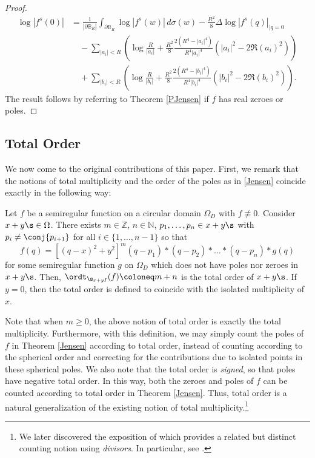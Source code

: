 \documentclass{amsart}
\begin{document}
\begin{proof}
    \begin{align*}\log|f^s(0)|&=\frac{1}{|\partial \mathbb B_R|}\int_{\partial \mathbb B_R}\log|f^s(w)|\,d\sigma (w)-\frac{R^2}{8}\Delta\log|f^s(q)|_{\mid q=0}\\ 
    &\quad-\sum_{|a_i|<R}\left(\log\frac{R}{|a_i|}+\frac{R^2}{8}\frac{2(R^4-|a_i|^4)}{R^4|a_i|^4}\left(|a_i|^2-2\Re(a_i)^2\right)\right)\\
    &\quad+\sum_{|b_i|<R}\left(\log\frac{R}{|b_i|}+\frac{R^2}{8}\frac{2(R^4-|b_i|^4)}{R^4|b_i|^4}\left(|b_i|^2-2\Re(b_i)^2\right)\right).\end{align*}
    The result follows by referring to Theorem \ref{PJensen} if $f$ has real zeroes or poles. 
\end{proof}

\subsection{Total Order}

We now come to the original contributions of this paper. First, we remark that the notions of total multiplicity and the order of the poles as in \ref{Jensen} coincide exactly in the following way: 

\begin{defin}\label{totalOrder}
    Let $f$ be a semiregular function on a circular domain $\Omega_D$ with $f\not\equiv0$. Consider $x+y\s\in\Omega$. There exists $m\in\mathbb{Z}$, $n\in\mathbb{N}$, $p_1,\dots,p_n\in x+y\s$ with $p_i\neq \conj {p_{i+1}}$ for all $i\in\{1,\dots,n-1\}$ so that \[f(q)=[(q-x)^2+y^2]^m(q-p_1)*(q-p_2)*\dots*(q-p_n)*g(q)\] for some semiregular function $g$ on $\Omega_D$ which does not have poles nor zeroes in $x+y\s$. Then, $\ordt_{\s_{x+yI}}(f)\coloneq m+n$ is the total order of $x+y\s$. If $y=0$, then the total order is defined to coincide with the isolated multiplicity of $x$. 

\end{defin}
Note that when $m\geq0$, the above notion of total order is exactly the total multiplicity. Furthermore, with this definition, we may simply count the poles of $f$ in Theorem \ref{Jensen} according to total order, instead of counting according to the spherical order and correcting for the contributions due to isolated points in these spherical poles. We also note that the total order is \emph{signed}, so that poles have negative total order. In this way, both the zeroes and poles of $f$ can be counted according to total order in Theorem \ref{Jensen}. Thus, total order is a natural generalization of the existing notion of total multiplicity.\footnote{We later discovered the exposition of \cite[Section 8]{Bisi2021} which provides a related but distinct counting notion using \emph{divisors}. In particular, see \cite[Proposition 8.8]{Bisi2021}.}
\end{document}
